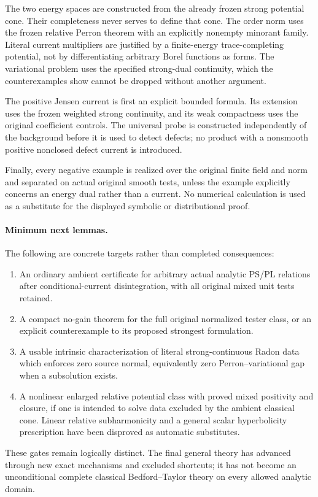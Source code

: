 \documentclass[11pt,a4paper]{article}
\numberwithin{equation}{section}
\theoremstyle{definition}
\theoremstyle{remark}
\begin{document}
The two energy spaces are constructed from the already frozen
strong potential cone. Their completeness never serves to
define that cone. The order norm uses the frozen relative
Perron theorem with an explicitly nonempty minorant family.
Literal current multipliers are justified by a finite-energy
trace-completing potential, not by differentiating arbitrary
Borel functions as forms. The variational problem uses the
specified strong-dual continuity, which the counterexamples
show cannot be dropped without another argument.

The positive Jensen current is first an explicit bounded
formula. Its extension uses the frozen weighted strong
continuity, and its weak compactness uses the original
coefficient controls. The universal probe is constructed
independently of the background before it is used to detect
defects; no product with a nonsmooth positive nonclosed
defect current is introduced.

Finally, every negative example is realized over the original
finite field and norm and separated on actual original smooth
tests, unless the example explicitly concerns an energy dual
rather than a current. No numerical calculation is used as a
substitute for the displayed symbolic or distributional proof.

\paragraph{Minimum next lemmas.}
The following are concrete targets rather than completed
consequences:
\begin{enumerate}
\item An ordinary ambient certificate for arbitrary actual
analytic PS/PL relations after conditional-current
disintegration, with all original mixed unit tests retained.
\item A compact no-gain theorem for the full original normalized
tester class, or an explicit counterexample to its proposed
strongest formulation.
\item A usable intrinsic characterization of literal
strong-continuous Radon data which enforces zero source normal,
equivalently zero Perron--variational gap when a subsolution exists.
\item A nonlinear enlarged relative potential class with proved
mixed positivity and closure, if one is intended to solve data
excluded by the ambient classical cone. Linear relative
subharmonicity and a general scalar hyperbolicity prescription
have been disproved as automatic substitutes.
\end{enumerate}
These gates remain logically distinct. The final general theory
has advanced through new exact mechanisms and excluded shortcuts;
it has not become an unconditional complete classical
Bedford--Taylor theory on every allowed analytic domain.


\end{document}

